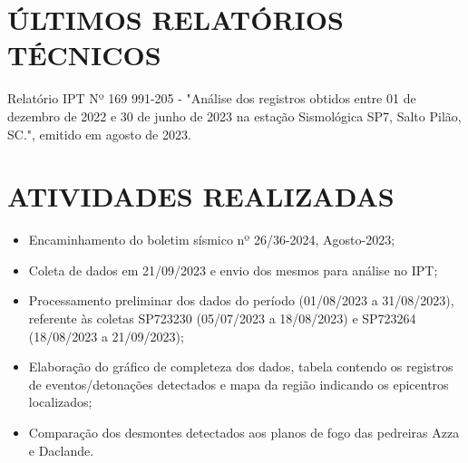 \pagestyle{geral}
\section{ÚLTIMOS RELATÓRIOS TÉCNICOS}
\label{sec:ultimos_relatorios}
\begin{itemize}
    Relatório IPT Nº 169 991-205 - "Análise dos registros obtidos entre 01 de dezembro de 2022 e 30 de junho de 2023 na estação Sismológica SP7, Salto Pilão, SC.", emitido em agosto de 2023. 
\end{itemize}

\section{ATIVIDADES REALIZADAS}
\label{sec:atividade}
\begin{itemize}
    \item Encaminhamento do boletim sísmico nº 26/36-2024, Agosto-2023;
    \item Coleta de dados em 21/09/2023 e envio dos mesmos para análise no IPT;
    \item Processamento preliminar dos dados do período (01/08/2023 a 31/08/2023), referente às coletas SP723230 (05/07/2023 a 18/08/2023) e SP723264 (18/08/2023 a 21/09/2023); 
    \item Elaboração do gráfico de completeza dos dados, tabela contendo os registros de eventos/detonações detectados e mapa da região indicando os epicentros localizados;
	\item  Comparação dos desmontes detectados aos planos de fogo das pedreiras Azza e Daclande.
\end{itemize}

